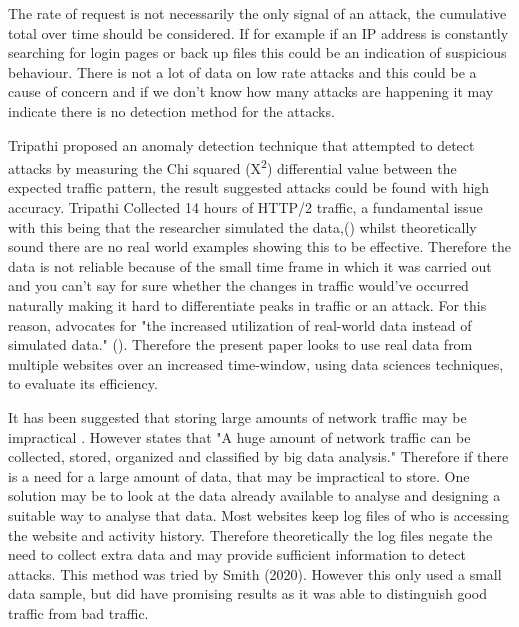 The rate of request is not necessarily the only signal of an attack, the cumulative total over time should be considered. If for example if an IP address is constantly searching for login pages or back up files this could be an indication of suspicious behaviour. There is not a lot of data on low rate attacks and this could be a cause of concern and if we don't know how many attacks are happening it may indicate there is no detection method for the attacks. 

 
 Tripathi proposed an anomaly detection technique that attempted to detect attacks by measuring the Chi squared (X\textsuperscript{\small2}) differential value between the expected traffic pattern, the result suggested attacks could be found with high accuracy. Tripathi Collected 14 hours of HTTP/2 traffic, a fundamental issue with this being that the researcher simulated the data,(\cite{tripathi2018slow}) whilst theoretically sound there are no real world examples showing this to be effective. Therefore the data is not reliable because of the small time frame in which it was carried out and you can't say for sure whether the changes in traffic would've occurred naturally making it hard to differentiate peaks in traffic or an attack. For this reason, \citeauthor{8500383} advocates for "the increased utilization of real-world data instead of simulated data." (\cite{8500383}). Therefore the present paper looks to use real data from multiple websites over an increased time-window, using data sciences techniques, to evaluate its efficiency. 

It has been suggested that storing large amounts of network traffic may be impractical \cite{staniford2002practical}. However \citeauthor{9016229} states that "A huge amount of network traffic can be collected, stored, organized and classified by big data analysis." \cite{9016229} Therefore if there is a need for a large amount of data, that may be impractical to store. One solution may be to look at the data already available to analyse and designing a suitable way to analyse that data. Most websites keep log files of who is accessing the website and activity history. Therefore theoretically the log files negate the need to collect extra data and may provide sufficient information to detect attacks. This method was tried by Smith (2020). However this only used a small data sample, but did have promising results as it was able to distinguish good traffic from bad traffic. 

